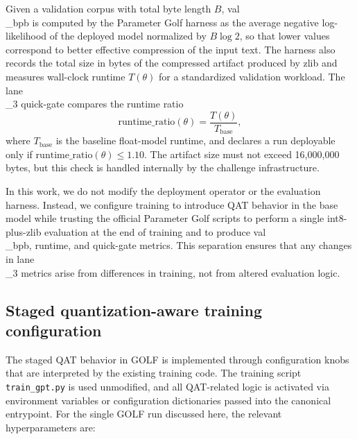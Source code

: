 \documentclass{article}
\begin{document}
Given a validation corpus with total byte length \(B\), val\\_bpb is computed by the Parameter Golf harness as the average negative log-likelihood of the deployed model normalized by \(B \log 2\), so that lower values correspond to better effective compression of the input text. The harness also records the total size in bytes of the compressed artifact produced by zlib and measures wall-clock runtime \(T(\theta)\) for a standardized validation workload. The lane\\_3 quick-gate compares the runtime ratio
\[
\mathrm{runtime\_ratio}(\theta) = \frac{T(\theta)}{T_\text{base}},
\]
where \(T_\text{base}\) is the baseline float-model runtime, and declares a run deployable only if \(\mathrm{runtime\_ratio}(\theta) \leq 1.10\). The artifact size must not exceed 16,000,000 bytes, but this check is handled internally by the challenge infrastructure.

In this work, we do not modify the deployment operator or the evaluation harness. Instead, we configure training to introduce QAT behavior in the base model while trusting the official Parameter Golf scripts to perform a single int8-plus-zlib evaluation at the end of training and to produce val\\_bpb, runtime, and quick-gate metrics. This separation ensures that any changes in lane\\_3 metrics arise from differences in training, not from altered evaluation logic.

\subsection{Staged quantization-aware training configuration}

\label{sec:staged_quantization_aware_training_confi}

The staged QAT behavior in GOLF is implemented through configuration knobs that are interpreted by the existing training code. The training script \texttt{train\_gpt.py} is used unmodified, and all QAT-related logic is activated via environment variables or configuration dictionaries passed into the canonical entrypoint. For the single GOLF run discussed here, the relevant hyperparameters are:
\end{document}
